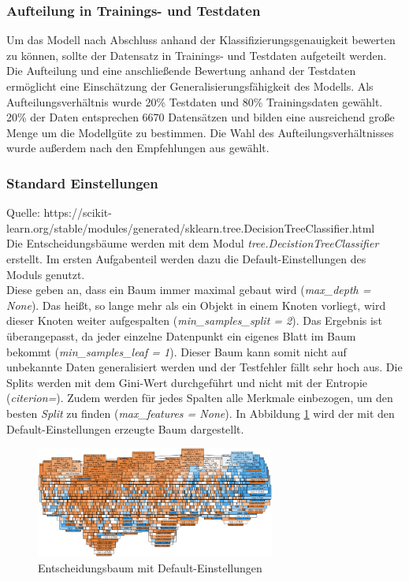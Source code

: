 \subsubsection{Aufteilung in Trainings- und Testdaten}
Um das Modell nach Abschluss anhand der Klassifizierungsgenauigkeit bewerten zu können, sollte der Datensatz in Trainings- und Testdaten aufgeteilt werden. Die Aufteilung und eine anschließende Bewertung anhand der Testdaten ermöglicht eine Einschätzung der Generalisierungsfähigkeit des Modells. Als Aufteilungsverhältnis wurde 20\% Testdaten und 80\% Trainingsdaten gewählt. 20\% der Daten entsprechen 6670 Datensätzen und bilden eine ausreichend große Menge um die Modellgüte zu bestimmen. Die Wahl des Aufteilungsverhältnisses wurde außerdem nach den Empfehlungen aus \cite{geron2017hands-on} gewählt.

\subsubsection{Standard Einstellungen}
Quelle: https://scikit-learn.org/stable/modules/generated/sklearn.tree.DecisionTreeClassifier.html\\
Die Entscheidungsbäume werden mit dem Modul \emph{tree.DecistionTreeClassifier} erstellt. Im ersten Aufgabenteil werden dazu die Default-Einstellungen des Moduls genutzt.\\
\noindent \hspace*{7mm}
Diese geben an, dass ein Baum immer maximal gebaut wird (\emph{max\_depth = None}). Das heißt, so lange mehr als ein Objekt in einem Knoten vorliegt, wird dieser Knoten weiter aufgespalten (\emph{min\_samples\_split = 2}). Das Ergebnis ist überangepasst, da jeder einzelne Datenpunkt ein eigenes Blatt im Baum bekommt (\emph{min\_samples\_leaf = 1}). Dieser Baum kann somit nicht auf unbekannte Daten generalisiert werden und der Testfehler fällt sehr hoch aus. Die Splits werden mit dem Gini-Wert durchgeführt und nicht mit der Entropie (\emph{citerion=}). Zudem werden für jedes Spalten alle Merkmale einbezogen, um den besten \emph{Split} zu finden (\emph{max\_features = None}). In Abbildung \ref{fig:treedefault} wird der mit den Default-Einstellungen erzeugte Baum dargestellt.
\begin{figure}[h]
	\centering
	\includegraphics[width = 0.7\textwidth]{Bilder/treedefault}
	\caption{Entscheidungsbaum mit Default-Einstellungen}
	\label{fig:treedefault}
\end{figure}
